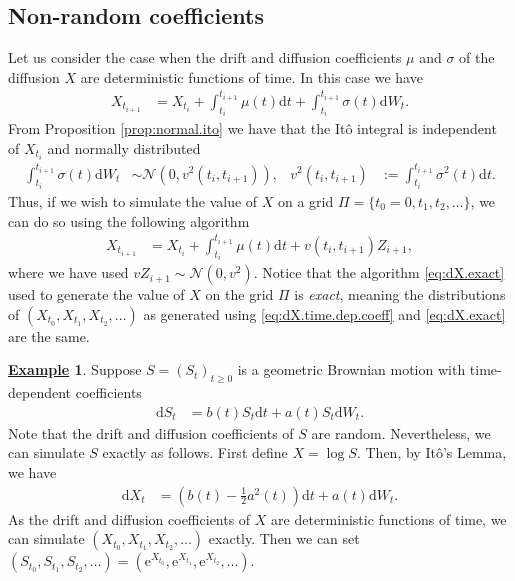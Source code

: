 \documentclass[12pt]{book}
\numberwithin{equation}{chapter}
\theoremstyle{plain}
\numberwithin{theorem}{section}
\theoremstyle{definition}
\newtheorem{example}[theorem]{\underline{Example}}
\numberwithin{exercise}{chapter}
\newcommand{\<}{\langle}
\renewcommand{\>}{\rangle}
\renewcommand{\(}{\left(}
\renewcommand{\)}{\right)}
\renewcommand{\[}{\left[}
\renewcommand{\]}{\right]}
\newcommand\Nc{\mathscr{N}}
\newcommand\sig{\sigma}
\newcommand\dd{\mathrm{d}}
\newcommand\ee{\mathrm{e}}
\begin{document}
\subsection{Non-random coefficients}
Let us consider the case when the drift and diffusion coefficients $\mu$ and $\sig$ of the diffusion $X$ are deterministic functions of time.  In this case we have
\begin{align}
X_{{t_{i+1}}}
	&=	X_{t_i} + \int_{t_i}^{t_{i+1}} \mu(t) \dd t + \int_{t_i}^{t_{i+1}} \sig(t) \dd W_t . \label{eq:dX.time.dep.coeff}
\end{align}
From Proposition \ref{prop:normal.ito} we have that the It\^o integral is independent of $X_{t_i}$ and normally distributed
\begin{align}
\int_{t_i}^{t_{i+1}} \sig(t) \dd W_t
	&\sim \Nc(0,v^2(t_i,t_{i+1})) , &
v^2(t_i,t_{i+1})
	&:=	\int_{t_i}^{t_{i+1}} \sig^2(t) \dd t .
\end{align}
Thus, if we wish to simulate the value of $X$ on a grid $\Pi = \{ t_0 = 0, t_1, t_2, \ldots \}$, we can do so using the following algorithm
\begin{align}
X_{{t_{i+1}}}
	&=	X_{t_i} + \int_{t_i}^{t_{i+1}} \mu(t) \dd t + v(t_i,t_{i+1}) Z_{i+1} , \label{eq:dX.exact}
\end{align}
where we have used $v Z_{i+1} \sim \Nc(0,v^2)$.  Notice that the algorithm \eqref{eq:dX.exact} used to generate the value of $X$ on the grid $\Pi$ is \emph{exact}, meaning the distributions of $(X_{t_0},X_{t_1},X_{t_2},\ldots)$ as generated using \eqref{eq:dX.time.dep.coeff} and \eqref{eq:dX.exact} are the same.

\begin{example}
Suppose $S = (S_t)_{t \geq 0}$ is a geometric Brownian motion with time-dependent coefficients
\begin{align}
\dd S_t
	&=	b(t) S_t \dd t + a(t) S_t \dd W_t .
\end{align}
Note that the drift and diffusion coefficients of $S$ are random.  Nevertheless, we can simulate $S$ exactly as follows.  First define $X = \log S$.  Then, by It\^o's Lemma, we have
\begin{align}
\dd X_t
	&=	\( b(t) - \tfrac{1}{2} a^2(t) \) \dd t + a(t) \dd W_t .
\end{align}
As the drift and diffusion coefficients of $X$ are deterministic functions of time, we can simulate $(X_{t_0},X_{t_1},X_{t_2},\ldots)$ exactly.  Then we can set
$(S_{t_0},S_{t_1},S_{t_2},\ldots) =	(\ee^{X_{t_0}},\ee^{X_{t_1}},\ee^{X_{t_2}},\ldots)$.
\end{example}
\end{document}
